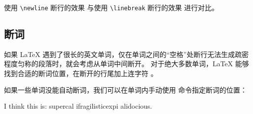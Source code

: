 \begin{example}
使用 \verb|\newline| 断行的效果
\newline
与使用 \verb|\linebreak| 断行的效果
\linebreak
进行对比。
\end{example}

\subsection{断词}\label{subsec:hyphen}

如果 \LaTeX{} 遇到了很长的英文单词，仅在单词之间的“空格”处断行无法生成疏密程度匀称的段落时，就会考虑从单词中间断开。
对于绝大多数单词，\LaTeX{} 能够找到合适的断词位置，在断开的行尾加上连字符 \char\hyphenchar\font 。

如果一些单词没能自动断词，我们可以在单词内手动使用 \cmd{-} 命令指定断词的位置：
\begin{example}
I think this is: su\-per\-cal\-%
i\-frag\-i\-lis\-tic\-ex\-pi\-%
al\-i\-do\-cious.
\end{example}

\endinput
